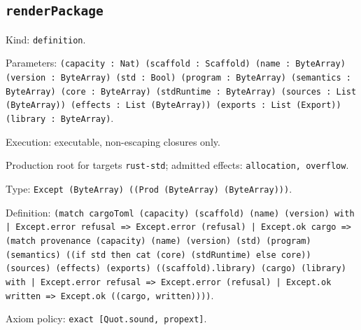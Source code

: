 \documentclass[11pt]{article}
\begin{document}
\subsection*{\texttt{renderPackage}}
\noindent Kind: \texttt{definition}.\par
\noindent Parameters: \texttt{(capacity : Nat) (scaffold : Scaffold) (name : ByteArray) (version : ByteArray) (std : Bool) (program : ByteArray) (semantics : ByteArray) (core : ByteArray) (stdRuntime : ByteArray) (sources : List (ByteArray)) (effects : List (ByteArray)) (exports : List (Export)) (library : ByteArray)}.\par
\noindent Execution: executable, non-escaping closures only.\par
\noindent Production root for targets \texttt{rust-std}; admitted effects: \texttt{allocation, overflow}.\par
\noindent Type: \texttt{Except (ByteArray) ((Prod (ByteArray) (ByteArray)))}.\par
\noindent Definition: \texttt{(match cargoToml (capacity) (scaffold) (name) (version) with | Except.error refusal => Except.error (refusal) | Except.ok cargo => (match provenance (capacity) (name) (version) (std) (program) (semantics) ((if std then cat (core) (stdRuntime) else core)) (sources) (effects) (exports) ((scaffold).library) (cargo) (library) with | Except.error refusal => Except.error (refusal) | Except.ok written => Except.ok ((cargo, written))))}.\par
\noindent Axiom policy: \texttt{exact [Quot.sound, propext]}.\par
\end{document}
